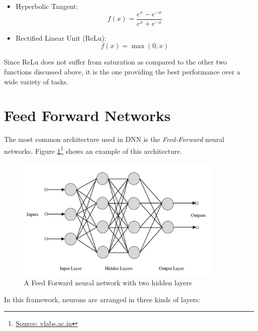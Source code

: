 \begin{itemize}
	\item Hyperbolic Tangent: 
	\begin{equation}
	f(x) = \dfrac{e^x - e^{-x}}{e^x + e^{-x}}	\end{equation}
\end{itemize} 

\begin{itemize}
	\item Rectified Linear Unit (ReLu)\cite{nair2010rectified}: 
	\begin{equation}
	f(x) = \max(0,x)
	\label{eq:ReLu}	
	\end{equation}
\end{itemize} 

 Since ReLu does not suffer from saturation as compared to the other two functions discussed above, it is the one providing the best performance over a wide variety of tasks.

\section{Feed Forward Networks}
\label{sec:feedforward}
The most common architecture used in DNN is the \textit{Feed-Forward} neural networks. Figure \ref{fig:feedforward}\footnote{\href{http://cse22-iiith.vlabs.ac.in/exp4/index.html}{Source: vlabs.ac.in}} shows an example of this architecture.

\begin{figure}[h]
	\centering
	\includegraphics[width=10cm]{images/FeedForward}
	\caption{A Feed Forward neural network with two hidden layers}
	\label{fig:feedforward}
	
\end{figure}

In this framework, neurons are arranged in three kinds of layers:

